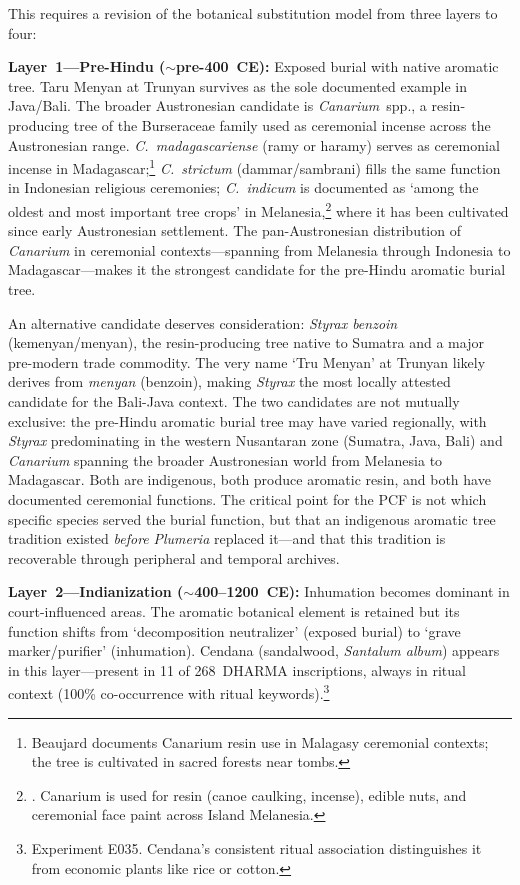\documentclass[12pt,a4paper]{article}
\begin{document}
This requires a revision of the botanical substitution model from three layers to four:

\textbf{Layer~1---Pre-Hindu ($\sim$pre-400~CE):} Exposed burial with native aromatic tree. Taru Menyan at Trunyan survives as the sole documented example in Java/Bali. The broader Austronesian candidate is \textit{Canarium}~spp., a resin-producing tree of the Burseraceae family used as ceremonial incense across the Austronesian range. \textit{C.~madagascariense} (ramy or haramy) serves as ceremonial incense in Madagascar;\footnote{Beaujard documents Canarium resin use in Malagasy ceremonial contexts; the tree is cultivated in sacred forests near tombs.} \textit{C.~strictum} (dammar/sambrani) fills the same function in Indonesian religious ceremonies; \textit{C.~indicum} is documented as `among the oldest and most important tree crops' in Melanesia,\footnote{\autocite{yen1995canarium}. Canarium is used for resin (canoe caulking, incense), edible nuts, and ceremonial face paint across Island Melanesia.} where it has been cultivated since early Austronesian settlement. The pan-Austronesian distribution of \textit{Canarium} in ceremonial contexts---spanning from Melanesia through Indonesia to Madagascar---makes it the strongest candidate for the pre-Hindu aromatic burial tree.

An alternative candidate deserves consideration: \textit{Styrax benzoin} (kemenyan/menyan), the resin-producing tree native to Sumatra and a major pre-modern trade commodity. The very name `Tru Menyan' at Trunyan likely derives from \emph{menyan} (benzoin), making \textit{Styrax} the most locally attested candidate for the Bali-Java context. The two candidates are not mutually exclusive: the pre-Hindu aromatic burial tree may have varied regionally, with \textit{Styrax} predominating in the western Nusantaran zone (Sumatra, Java, Bali) and \textit{Canarium} spanning the broader Austronesian world from Melanesia to Madagascar. Both are indigenous, both produce aromatic resin, and both have documented ceremonial functions. The critical point for the PCF is not which specific species served the burial function, but that an indigenous aromatic tree tradition existed \emph{before} \textit{Plumeria} replaced it---and that this tradition is recoverable through peripheral and temporal archives.

\textbf{Layer~2---Indianization ($\sim$400--1200~CE):} Inhumation becomes dominant in court-influenced areas. The aromatic botanical element is retained but its function shifts from `decomposition neutralizer' (exposed burial) to `grave marker/purifier' (inhumation). Cendana (sandalwood, \textit{Santalum album}) appears in this layer---present in 11 of 268~DHARMA inscriptions, always in ritual context (100\% co-occurrence with ritual keywords).\footnote{Experiment E035. Cendana's consistent ritual association distinguishes it from economic plants like rice or cotton.}
\end{document}
